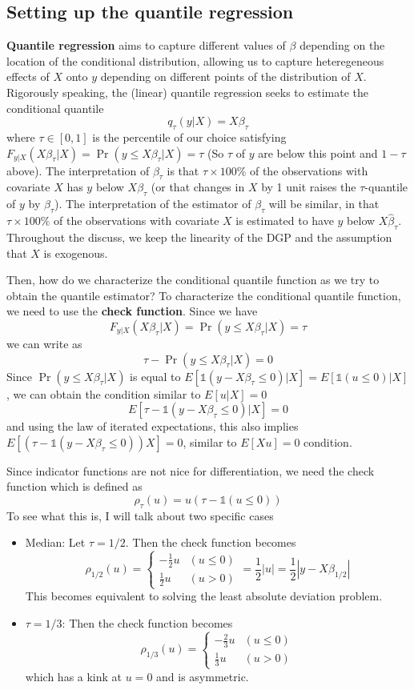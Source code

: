 \documentclass[12pt]{article}
\theoremstyle{definition}
\theoremstyle{property}
\theoremstyle{assumption}
\theoremstyle{example}
\theoremstyle{comment}
\begin{document}
\subsection{Setting up the quantile regression}
 \textbf{Quantile regression} aims to capture different values of $\beta$ depending on the location of the conditional distribution, allowing us to capture heteregeneous effects of $X$ onto $y$ depending on different points of the distribution of $X$. Rigorously speaking, the (linear) quantile regression seeks to estimate the conditional quantile
\[
q_\tau(y | X)=X\beta_\tau
\]
where $\tau\in[0,1]$ is the percentile of our choice satisfying $F_{y|X}(X\beta_\tau|X)=\Pr(y\leq X\beta_\tau|X)=\tau$ (So $\tau$ of $y$ are below this point and $1-\tau$ above). The interpretation of $\beta_\tau$ is that $\tau\times100\%$ of the observations with covariate $X$ has $y$ below $X\beta_\tau$ (or that changes in $X$ by 1 unit raises the $\tau$-quantile of $y$ by $\beta_\tau$). The interpretation of the estimator of $\beta_\tau$ will be similar, in that $\tau\times100\%$ of the observations with covariate $X$ is estimated to have $y$ below $X\hat{\beta}_\tau$. Throughout the discuss, we keep the linearity of the DGP and the assumption that $X$ is exogenous. \par 
Then, how do we characterize the conditional quantile function as we try to obtain the quantile estimator? To characterize the conditional quantile function, we need to use the \textbf{check function}. Since we have
\[
F_{y|X}(X\beta_\tau|X)=\Pr(y\leq X\beta_\tau|X)=\tau
\]
we can write as
\[
\tau-\Pr(y\leq X\beta_\tau|X)=0
\]
Since $\Pr(y\leq X\beta_\tau|X)$ is equal to $E[\mathbb{1}(y- X\beta_\tau\leq 0)|X]=E[\mathbb{1}(u\leq0)|X]$, we can obtain the condition similar to $E[u|X]=0$
\[
E[\tau-\mathbb{1}(y- X\beta_\tau\leq 0)|X]=0
\]
and using the law of iterated expectations, this also implies $E[(\tau-\mathbb{1}(y- X\beta_\tau\leq 0))X]=0$, similar to $E[Xu]=0$ condition. 
\par
Since indicator functions are not nice for differentiation, we need the check function which is defined as
\[
\rho_\tau(u)=u(\tau-\mathbb{1}(u\leq0))
\]
To see what this is, I will talk about two specific cases
\begin{itemize}
\item Median: Let $\tau=1/2$. Then the check function becomes
\[
\rho_{1/2}(u)=\begin{cases}-\frac{1}{2}u & (u\leq 0) \\ \frac{1}{2}u & (u>0) \end{cases} = \frac{1}{2}|u|=\frac{1}{2}|y-X\beta_{1/2}|
\]
This becomes equivalent to solving the least absolute deviation problem.
\item $\tau=1/3$: Then the check function becomes
\[
\rho_{1/3}(u)=\begin{cases}-\frac{2}{3}u & (u\leq 0) \\ \frac{1}{3}u & (u>0) \end{cases}
\]
which has a kink at $u=0$ and is asymmetric.
\end{itemize}\par
\end{document}
